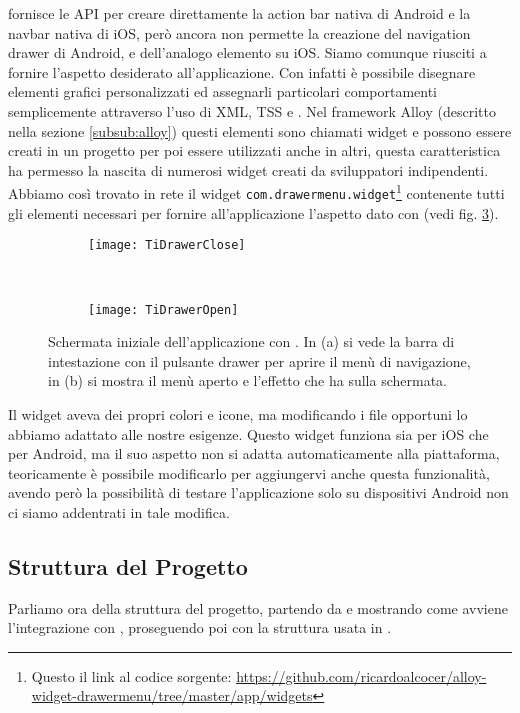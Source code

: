 			\tisdk{} fornisce le API per creare direttamente la action bar nativa 
			di Android e la navbar nativa di iOS, però ancora non permette la 
			creazione del navigation drawer di Android, e dell'analogo 
			elemento su iOS. Siamo comunque riusciti a fornire l'aspetto 
			desiderato all'applicazione.
			Con \tisdk{} infatti è possibile disegnare elementi grafici 
			personalizzati ed assegnarli particolari comportamenti 
			semplicemente attraverso l'uso di XML, TSS e \js{}. Nel framework Alloy 
			(descritto nella sezione \ref{subsub:alloy}) questi elementi sono 
			chiamati widget e possono essere creati in un progetto per poi essere 
			utilizzati anche in altri, questa caratteristica ha permesso la nascita 
			di numerosi widget creati da sviluppatori indipendenti. 
			Abbiamo così trovato in rete il widget
			\texttt{com.drawermenu.widget}\footnote{Questo il link al codice
			sorgente: \url{https://github.com/ricardoalcocer/alloy-widget-drawermenu/tree/master/app/widgets}}
			contenente tutti gli elementi necessari per fornire all'applicazione 
			l'aspetto dato con \kendomob{} (vedi fig. \ref{fig:tidrawer}).
			\begin{figure}[h]
				\centering
				\begin{subfigure}[b]{0.485\textwidth}
					\texttt{[image: TiDrawerClose]}
					\caption{}
					\label{fig:tiDrawerClose}
				\end{subfigure}
				~
				\begin{subfigure}[b]{0.485\textwidth}
					\texttt{[image: TiDrawerOpen]}
					\caption{}
					\label{fig:tiDrawerOpen}
				\end{subfigure}
				\caption{Schermata iniziale dell'applicazione con \tisdk{}. 
				In (a) si vede la barra di intestazione con il pulsante drawer per aprire 
				il menù di navigazione, in (b) si mostra il menù aperto 
				e l'effetto che ha sulla schermata.}
				\label{fig:tidrawer}
			\end{figure}
			Il widget aveva dei propri colori e icone, ma modificando i file 
			opportuni lo abbiamo adattato alle nostre esigenze.
			Questo widget funziona sia per iOS che per Android, ma il suo aspetto 
			non si adatta automaticamente alla piattaforma, teoricamente è possibile
			modificarlo per aggiungervi anche questa funzionalità, avendo però 
			la possibilità di testare l'applicazione solo su dispositivi Android 
			non ci siamo addentrati in tale modifica.
			
			
		\subsection{Struttura del Progetto}
			Parliamo ora della struttura del progetto, partendo da \pg{} e mostrando 
			come avviene l'integrazione con \kendomob{}, proseguendo poi con 
			la struttura usata in \tisdk{}.
		
